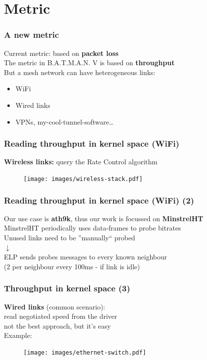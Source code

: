 \documentclass[slidestop]{beamer}
\begin{document}
\section{Metric}
\begin{frame}[c]
	\frametitle{A new metric}
	\begin{center}
		Current metric: based on \textbf{packet loss}\\
		\pause
		\vspace{0.5cm}
		The metric in B.A.T.M.A.N. V is based on \textbf{throughput}\\
		\pause
		\vspace{0.5cm}
		But a mesh network can have heterogeneous links:
		\begin{itemize}
			\item WiFi
			\item Wired links
			\item VPNs, my-cool-tunnel-software\dots
		\end{itemize}
	\end{center}
\end{frame}

\begin{frame}[c]
	\frametitle{Reading throughput in kernel space (WiFi)}
	\textbf{Wireless links:} query the Rate Control algorithm
	\vfill
	\pause
	\begin{figure}
		\centering
		\texttt{[image: images/wireless-stack.pdf]}
	\end{figure}
\end{frame}

\begin{frame}[c]
	\frametitle{Reading throughput in kernel space (WiFi) (2)}
	\begin{center}
	Our use case is \textbf{ath9k}, thus our work is focussed on
	\textbf{MinstrelHT}\\[0.5cm]
	MinstrelHT periodically uses data-frames to probe bitrates\\
	Unused links need to be ''manually`` probed\\[0.5cm]
	\pause
	$\downarrow$\\[0.5cm]
	ELP sends probes messages to every known neighbour\\
	(2 per neighbour every 100ms - if link is idle)
	\end{center}
\end{frame}

\begin{frame}[c]
	\frametitle{Throughput in kernel space (3)}
	\begin{center}
	\textbf{Wired links} (common scenario):\\
	read negotiated speed from the driver\\[0.5cm]
	\pause
	not the best approach, but it's easy\\[0.5cm]
	Example:
	\begin{figure}
		\centering
		\texttt{[image: images/ethernet-switch.pdf]}
	\end{figure}
	\end{center}
\end{frame}
\end{document}
